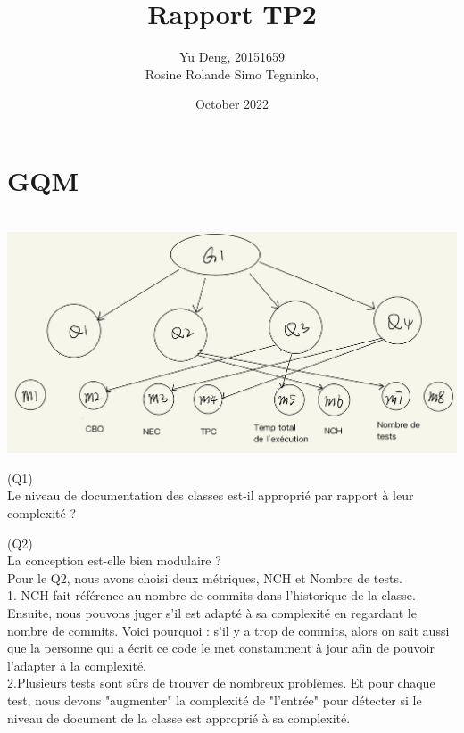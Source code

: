 \documentclass{article}
\title{Rapport TP2}
\author{Yu Deng, 20151659\\Rosine Rolande Simo Tegninko, }
\date{October 2022}
\begin{document}
\maketitle

\section{GQM}\\


\includegraphics[scale=0.2]{image.jpg} \\

\item(Q1)\\

Le niveau de documentation des classes est-il approprié par rapport à leur complexité ?\\


\item(Q2)\\

La conception est-elle bien modulaire ?\\

Pour le Q2, nous avons choisi deux métriques, NCH et Nombre de tests.\\

1.	NCH fait référence au nombre de commits dans l'historique de la classe. Ensuite, nous pouvons juger s'il est adapté à sa complexité en regardant le nombre de commits. Voici pourquoi : s'il y a trop de commits, alors on sait aussi que la personne qui a écrit ce code le met constamment à jour afin de pouvoir l'adapter à la complexité.\\

2.Plusieurs tests sont sûrs de trouver de nombreux problèmes. Et pour chaque test, nous devons "augmenter" la complexité de "l'entrée" pour détecter si le niveau de document de la classe est approprié à sa complexité.\\
\end{document}
